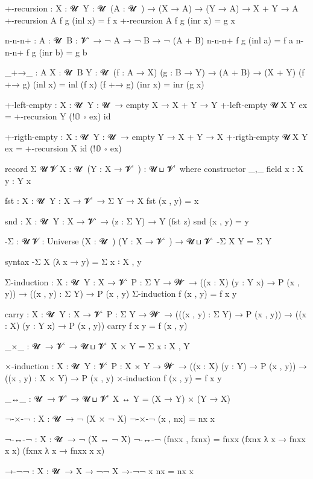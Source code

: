 +-recursion : {X : 𝓤 ̇ } {Y : 𝓤 ̇ } (A : 𝓤 ̇ ) 
            → (X → A) 
            → (Y → A) 
            → X + Y → A
+-recursion A f g (inl x) = f x
+-recursion A f g (inr x) = g x

n-n-n+ : {A : 𝓤 ̇ } {B : 𝓥 ̇ } → ¬ A → ¬ B → ¬ (A + B)
n-n-n+ f g (inl a) = f a
n-n-n+ f g (inr b) = g b

_+→_ : {A X : 𝓤 ̇ } {B Y : 𝓤 ̇ } (f : A → X) (g : B → Y) 
     → (A + B) → (X + Y)
(f +→ g) (inl x) = inl (f x)
(f +→ g) (inr x) = inr (g x)

+-left-empty : {X : 𝓤 ̇ } {Y : 𝓤 ̇ } 
             → empty X 
             → X + Y → Y
+-left-empty {𝓤} {X} {Y} ex = +-recursion Y (!𝟘 ∘ ex) id 

+-rigth-empty : {X : 𝓤 ̇ } {Y : 𝓤 ̇ }
              → empty Y
              → X + Y → X 
+-rigth-empty {𝓤} {X} {Y} ex = +-recursion X id (!𝟘 ∘ ex)

record Σ {𝓤 𝓥} {X : 𝓤 ̇ } (Y : X → 𝓥 ̇ ) : 𝓤 ⊔ 𝓥 ̇  where
    constructor
        _,_
    field
        x : X
        y : Y x

fst : {X : 𝓤 ̇ } {Y : X → 𝓥 ̇ } → Σ Y → X
fst (x , y) = x

snd : {X : 𝓤 ̇ } {Y : X → 𝓥 ̇ } → (z : Σ Y) → Y (fst z)
snd (x , y) = y

-Σ : {𝓤 𝓥 : Universe} (X : 𝓤 ̇ ) (Y : X → 𝓥 ̇ ) → 𝓤 ⊔ 𝓥 ̇
-Σ X Y = Σ Y

syntax -Σ X (λ x → y) = Σ x ꞉ X , y

Σ-induction : {X : 𝓤 ̇ } {Y : X → 𝓥 ̇ } {P : Σ Y → 𝓦 ̇ }
            → ((x : X) (y : Y x) → P (x , y))
            → ((x , y) : Σ Y) → P (x , y)
Σ-induction f (x , y) = f x y

carry : {X : 𝓤 ̇ } {Y : X → 𝓥 ̇ } {P : Σ Y → 𝓦 ̇ }
      → (((x , y) : Σ Y) → P (x , y))
      → ((x : X) (y : Y x) → P (x , y))
carry f x y = f (x , y)

_×_ : 𝓤 ̇ → 𝓥 ̇ → 𝓤 ⊔ 𝓥 ̇
X × Y = Σ x ꞉ X , Y

×-induction : {X : 𝓤 ̇ } {Y : 𝓥 ̇ } {P : X × Y → 𝓦 ̇ }
            → ((x : X) (y : Y) → P (x , y))
            → ((x , y) : X × Y) → P (x , y)
×-induction f (x , y) = f x y   

_↔_ : 𝓤 ̇ → 𝓥 ̇ → 𝓤 ⊔ 𝓥 ̇
X ↔ Y = (X → Y) × (Y → X)

¬-×-¬ : {X : 𝓤 ̇ } → ¬ (X × ¬ X)
¬-×-¬ (x , nx) = nx x

¬-↔-¬ : {X : 𝓤 ̇ } → ¬ (X ↔ ¬ X)
¬-↔-¬ (fnxx , fxnx) = fnxx (fxnx λ x → fnxx x x) (fxnx λ x → fnxx x x)

→-¬¬ : {X : 𝓤 ̇ } → X → ¬¬ X
→-¬¬ x nx = nx x

